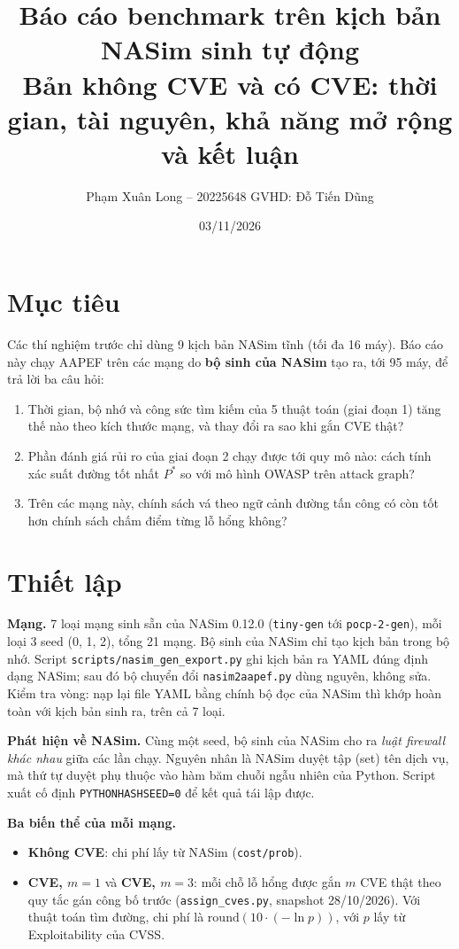 \documentclass[11pt,a4paper]{article}
\title{\textbf{Báo cáo benchmark trên kịch bản NASim sinh tự động}\\[2pt]
\large Bản không CVE và có CVE: thời gian, tài nguyên, khả năng mở rộng và kết luận}
\author{Phạm Xuân Long -- 20225648 \quad GVHD: Đỗ Tiến Dũng}
\date{03/11/2026}
\begin{document}
\maketitle
\vspace{-0.8cm}

\section{Mục tiêu}

Các thí nghiệm trước chỉ dùng 9 kịch bản NASim tĩnh (tối đa 16 máy). Báo cáo này chạy AAPEF trên các mạng do \textbf{bộ sinh của NASim} tạo ra, tới 95 máy, để trả lời ba câu hỏi:
\begin{enumerate}
  \item Thời gian, bộ nhớ và công sức tìm kiếm của 5 thuật toán (giai đoạn 1) tăng thế nào theo kích thước mạng, và thay đổi ra sao khi gắn CVE thật?
  \item Phần đánh giá rủi ro của giai đoạn 2 chạy được tới quy mô nào: cách tính xác suất đường tốt nhất $P^{*}$ so với mô hình OWASP trên attack graph?
  \item Trên các mạng này, chính sách vá theo ngữ cảnh đường tấn công có còn tốt hơn chính sách chấm điểm từng lỗ hổng không?
\end{enumerate}

\section{Thiết lập}

\textbf{Mạng.} 7 loại mạng sinh sẵn của NASim 0.12.0 (\texttt{tiny-gen} tới \texttt{pocp-2-gen}), mỗi loại 3 seed (0, 1, 2), tổng 21 mạng. Bộ sinh của NASim chỉ tạo kịch bản trong bộ nhớ. Script \texttt{scripts/nasim\_gen\_export.py} ghi kịch bản ra YAML đúng định dạng NASim; sau đó bộ chuyển đổi \texttt{nasim2aapef.py} dùng nguyên, không sửa. Kiểm tra vòng: nạp lại file YAML bằng chính bộ đọc của NASim thì khớp hoàn toàn với kịch bản sinh ra, trên cả 7 loại.

\textbf{Phát hiện về NASim.} Cùng một seed, bộ sinh của NASim cho ra \emph{luật firewall khác nhau} giữa các lần chạy. Nguyên nhân là NASim duyệt tập (set) tên dịch vụ, mà thứ tự duyệt phụ thuộc vào hàm băm chuỗi ngẫu nhiên của Python. Script xuất cố định \texttt{PYTHONHASHSEED=0} để kết quả tái lập được.

\textbf{Ba biến thể của mỗi mạng.}
\begin{itemize}
  \item \textbf{Không CVE}: chi phí lấy từ NASim (\texttt{cost/prob}).
  \item \textbf{CVE, $m = 1$} và \textbf{CVE, $m = 3$}: mỗi chỗ lỗ hổng được gắn $m$ CVE thật theo quy tắc gán công bố trước (\texttt{assign\_cves.py}, snapshot 28/10/2026). Với thuật toán tìm đường, chi phí là $\mathrm{round}(10 \cdot (-\ln p))$, với $p$ lấy từ Exploitability của CVSS.
\end{itemize}
\end{document}
